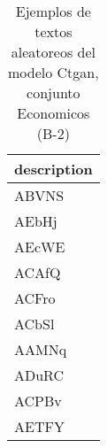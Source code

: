 \begin{table}[H]
\centering
\fontsize{8}{14}\selectfont
\caption{Ejemplos de textos aleatoreos del modelo Ctgan, conjunto Economicos (B-2)}
\label{table-sample10-economicos-b-2-ctgan-text}
\begin{tabular}{|m{50em}|}
\hline
\rowcolor[gray]{0.8}
description \\
\hline ABVNS \\
\hline AEbHj \\
\hline AEcWE \\
\hline ACAfQ \\
\hline ACFro \\
\hline ACbSl \\
\hline AAMNq \\
\hline ADuRC \\
\hline ACPBv \\
\hline AETFY \\
\hline
\end{tabular}
\end{table}
